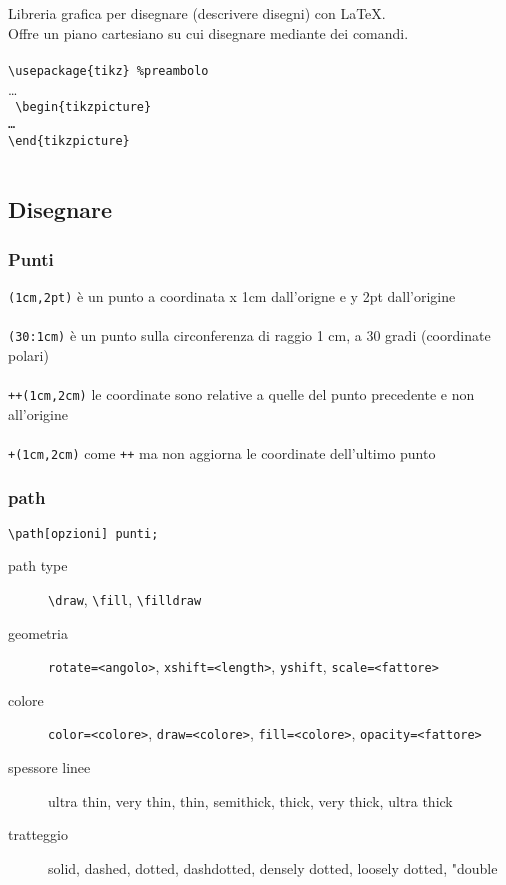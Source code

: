 \section{\Tikz}
  Libreria grafica per disegnare (descrivere disegni) con LaTeX.\\
  Offre un piano cartesiano su cui disegnare mediante dei comandi.\\~\\
  \texttt{\textbackslash{}usepackage\{tikz\} \%preambolo}\\
  \dots\\\texttt{
  \textbackslash{}begin\{tikzpicture\}\\
  \dots\\
  \textbackslash{}end\{tikzpicture\}~~\\~}
\subsection{Disegnare}
\subsubsection{Punti}
  \texttt{(1cm,2pt)} è un punto a coordinata x 1cm dall'origne e y 2pt dall'origine\\~\\
  \texttt{(30:1cm)} è un punto sulla circonferenza di raggio 1 cm, a 30 gradi (coordinate polari)\\~\\
  \texttt{++(1cm,2cm)} le coordinate sono relative a quelle del punto precedente e non all'origine\\~\\
  \texttt{+(1cm,2cm)} come \texttt{++} ma non aggiorna le coordinate dell'ultimo punto
\subsubsection{path}
  \texttt{\textbackslash{}path[opzioni] punti;}\\
  \begin{description}
    \item[path type] \texttt{\textbackslash{}draw}, \texttt{\textbackslash{}fill}, \texttt{\textbackslash{}filldraw}
    \item[geometria] \texttt{rotate=<angolo>}, \texttt{xshift=<length>}, \texttt{yshift}, \texttt{scale=<fattore>}
    \item[colore] \texttt{color=<colore>}, \texttt{draw=<colore>}, \texttt{fill=<colore>}, \texttt{opacity=<fattore>}
    \item[spessore linee] ultra thin, very thin, thin, semithick, thick, very thick, ultra thick
    \item[tratteggio] solid, dashed, dotted, dashdotted, densely dotted, loosely dotted, "double
  \end{description}
